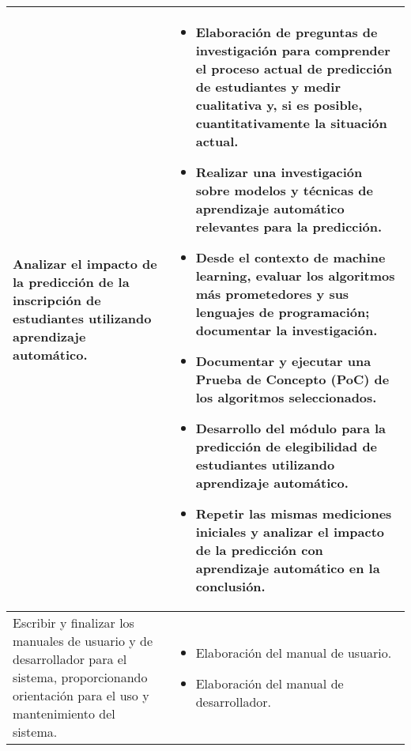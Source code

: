 \begin{longtable}{p{3in}|p{3in}}
Analizar el impacto de la predicción de la inscripción de estudiantes utilizando aprendizaje automático. &
\begin{itemize}
	\item Elaboración de preguntas de investigación para comprender el proceso actual de predicción de estudiantes y medir cualitativa y, si es posible, cuantitativamente la situación actual.
    \item Realizar una investigación sobre modelos y técnicas de aprendizaje automático relevantes para la predicción.
    \item Desde el contexto de machine learning, evaluar los algoritmos más prometedores y sus lenguajes de programación; documentar la investigación.
    \item Documentar y ejecutar una Prueba de Concepto (PoC) de los algoritmos seleccionados.
	\item Desarrollo del módulo para la predicción de elegibilidad de estudiantes utilizando aprendizaje automático.
	\item Repetir las mismas mediciones iniciales y analizar el impacto de la predicción con aprendizaje automático en la conclusión.
\end{itemize}
\\\hline

Escribir y finalizar los manuales de usuario y de desarrollador para el sistema, proporcionando orientación para el uso y mantenimiento del sistema. &
\begin{itemize}
    \item Elaboración del manual de usuario.
    \item Elaboración del manual de desarrollador.
\end{itemize}
\\\hline
\end{longtable}